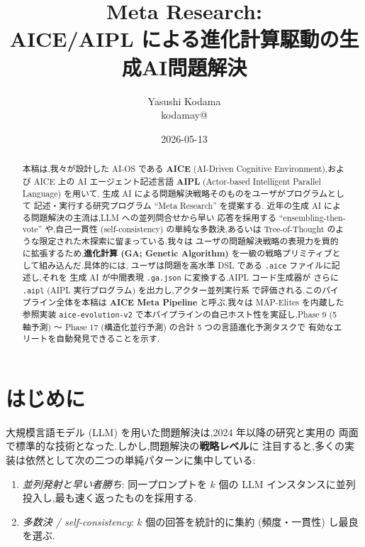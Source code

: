 \documentclass[11pt,a4paper]{article}
\title{\bfseries Meta Research: \\
       AICE/AIPL による進化計算駆動の生成AI問題解決}
\author{Yasushi Kodama \\ {\small kodamay@}}
\date{2026-05-13}
\newcommand{\code}[1]{\texttt{\small #1}}
\begin{document}
\maketitle

\begin{abstract}
本稿は,我々が設計した AI-OS である \textbf{AICE} (AI-Driven Cognitive
Environment),および AICE 上の AI エージェント記述言語
\textbf{AIPL} (Actor-based Intelligent Parallel Language) を用いて,
生成 AI による問題解決戦略そのものをユーザがプログラムとして
記述・実行する研究プログラム ``Meta Research'' を提案する.
近年の生成 AI による問題解決の主流は,LLM への並列問合せから早い
応答を採用する ``ensembling-then-vote'' や,自己一貫性 (self-consistency)
\cite{wang2022selfconsistency} の単純な多数決,あるいは Tree-of-Thought
\cite{yao2023tot} のような限定された木探索に留まっている.我々は
ユーザの問題解決戦略の表現力を質的に拡張するため,\textbf{進化計算 (GA;
Genetic Algorithm)} を一級の戦略プリミティブとして組み込んだ.具体的には,
ユーザは問題を高水準 DSL である \code{.aice} ファイルに記述し,それを
生成 AI が中間表現 \code{.ga.json} に変換する.AIPL コード生成器が
さらに \code{.aipl} (AIPL 実行プログラム) を出力し,アクター並列実行系
で評価される.このパイプライン全体を本稿は \textbf{AICE Meta Pipeline}
と呼ぶ.我々は MAP-Elites を内蔵した参照実装 \code{aice-evolution-v2}
で本パイプラインの自己ホスト性を実証し,Phase 9 (5 軸予測) 〜
Phase 17 (構造化並行予測) の合計 5 つの言語進化予測タスクで
有効なエリートを自動発見できることを示す.
\end{abstract}

\tableofcontents

\section{はじめに}

大規模言語モデル (LLM) を用いた問題解決は,2024 年以降の研究と実用の
両面で標準的な技術となった.しかし,問題解決の\textbf{戦略レベル}に
注目すると,多くの実装は依然として次の二つの単純パターンに集中している:

\begin{enumerate}[leftmargin=*,itemsep=0pt]
  \item \emph{並列発射と早い者勝ち}: 同一プロンプトを $k$ 個の LLM
    インスタンスに並列投入し,最も速く返ったものを採用する.
  \item \emph{多数決 / self-consistency}\cite{wang2022selfconsistency}:
    $k$ 個の回答を統計的に集約 (頻度・一貫性) し最良を選ぶ.
\end{enumerate}
\end{document}
